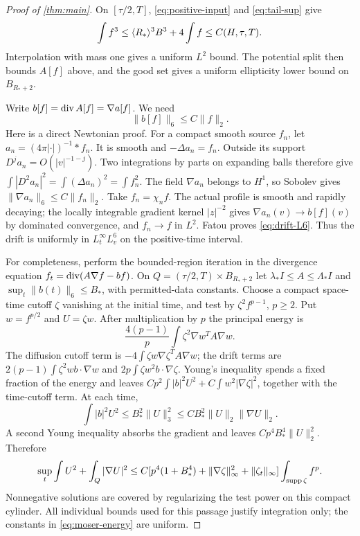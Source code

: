 \begin{proof}[Proof of \cref{thm:main}]
On $[\tau/2,T]$, \eqref{eq:positive-input} and \eqref{eq:tail-sup} give
\[
 \int f^3\le\langle R_*\rangle^3B^3+4\int f\le C(H,\tau,T).
\]
Interpolation with mass one gives a uniform $L^2$ bound. The potential split then bounds $A[f]$ above, and the good set gives a uniform ellipticity lower bound on $B_{R_*+2}$.

Write $b[f]=\operatorname{div} A[f]=\nabla a[f]$. We need
\begin{equation}\label{eq:drift-L6}
 \|b[f]\|_6\le C\|f\|_2.
\end{equation}
Here is a direct Newtonian proof. For a compact smooth source $f_n$, let $a_n=(4\pi|\cdot|)^{-1}*f_n$. It is smooth and $-\Delta a_n=f_n$. Outside its support $D^ja_n=O(|v|^{-1-j})$. Two integrations by parts on expanding balls therefore give
$\int|D^2a_n|^2=\int(\Delta a_n)^2=\int f_n^2$.
The field $\nabla a_n$ belongs to $H^1$, so Sobolev gives $\|\nabla a_n\|_6\le C\|f_n\|_2$. Take $f_n=\chi_nf$. The actual profile is smooth and rapidly decaying; the locally integrable gradient kernel $|z|^{-2}$ gives $\nabla a_n(v)\to b[f](v)$ by dominated convergence, and $f_n\to f$ in $L^2$. Fatou proves \eqref{eq:drift-L6}. Thus the drift is uniformly in $L^\infty_tL^6_v$ on the positive-time interval.

For completeness, perform the bounded-region iteration in the divergence equation
$f_t=\operatorname{div}(A\nabla f-bf)$. On $Q=(\tau/2,T)\times B_{R_*+2}$ let
$\lambda_*I\le A\le\Lambda_*I$ and $\sup_t\|b(t)\|_6\le B_*$, with permitted-data constants. Choose a compact space-time cutoff $\zeta$ vanishing at the initial time, and test by $\zeta^2f^{p-1}$, $p\ge2$. Put $w=f^{p/2}$ and $U=\zeta w$. After multiplication by $p$ the principal energy is
\[
 \frac{4(p-1)}p\int\zeta^2\nabla w^TA\nabla w.
\]
The diffusion cutoff term is $-4\int\zeta w\nabla\zeta^TA\nabla w$; the drift terms are
$2(p-1)\int\zeta^2w b\cdot\nabla w$ and $2p\int\zeta w^2b\cdot\nabla\zeta$.
Young's inequality spends a fixed fraction of the energy and leaves
$Cp^2\int|b|^2U^2+C\int w^2|\nabla\zeta|^2$, together with the time-cutoff term. At each time,
\[
 \int|b|^2U^2\le B_*^2\|U\|_3^2
 \le CB_*^2\|U\|_2\|\nabla U\|_2.
\]
A second Young inequality absorbs the gradient and leaves $Cp^4B_*^4\|U\|_2^2$. Therefore
\begin{equation}\label{eq:moser-energy}
 \sup_t\int U^2+\int_Q|\nabla U|^2
 \le C[p^4(1+B_*^4)+\|\nabla\zeta\|_\infty^2+\|\zeta_t\|_\infty]
 \int_{\operatorname{supp}\zeta}f^p.
\end{equation}
Nonnegative solutions are covered by regularizing the test power on this compact cylinder. All individual bounds used for this passage justify integration only; the constants in \eqref{eq:moser-energy} are uniform.


\end{proof}
